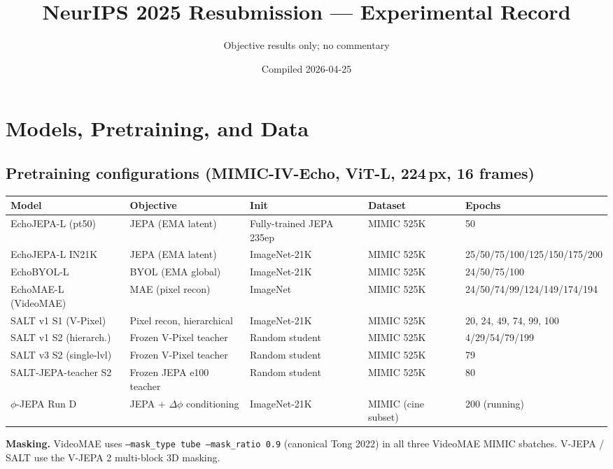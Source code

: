 \documentclass{article}
\title{NeurIPS 2025 Resubmission --- Experimental Record}
\author{Objective results only; no commentary}
\date{Compiled 2026-04-25}
\begin{document}
\maketitle

\tableofcontents
\newpage

\section{Models, Pretraining, and Data}

\subsection{Pretraining configurations (MIMIC-IV-Echo, ViT-L, 224\,px, 16 frames)}

\begin{center}
\begin{tabular}{lllll}
\toprule
Model & Objective & Init & Dataset & Epochs \\
\midrule
EchoJEPA-L (pt50) & JEPA (EMA latent) & Fully-trained JEPA 235ep & MIMIC 525K & 50 \\
EchoJEPA-L IN21K  & JEPA (EMA latent) & ImageNet-21K & MIMIC 525K & 25/50/75/100/125/150/175/200 \\
EchoBYOL-L        & BYOL (EMA global) & ImageNet-21K & MIMIC 525K & 24/50/75/100 \\
EchoMAE-L (VideoMAE) & MAE (pixel recon) & ImageNet   & MIMIC 525K & 24/50/74/99/124/149/174/194 \\
SALT v1 S1 (V-Pixel) & Pixel recon, hierarchical & ImageNet-21K & MIMIC 525K & 20, 24, 49, 74, 99, 100 \\
SALT v1 S2 (hierarch.) & Frozen V-Pixel teacher & Random student & MIMIC 525K & 4/29/54/79/199 \\
SALT v3 S2 (single-lvl) & Frozen V-Pixel teacher & Random student & MIMIC 525K & 79 \\
SALT-JEPA-teacher S2 & Frozen JEPA e100 teacher & Random student & MIMIC 525K & 80 \\
$\phi$-JEPA Run D & JEPA + $\Delta\phi$ conditioning & ImageNet-21K & MIMIC (cine subset) & 200 (running) \\
\bottomrule
\end{tabular}
\end{center}

\textbf{Masking.} VideoMAE uses \texttt{--mask\_type tube --mask\_ratio 0.9} (canonical Tong 2022) in all three VideoMAE MIMIC sbatches. V-JEPA / SALT use the V-JEPA 2 multi-block 3D masking.
\end{document}
